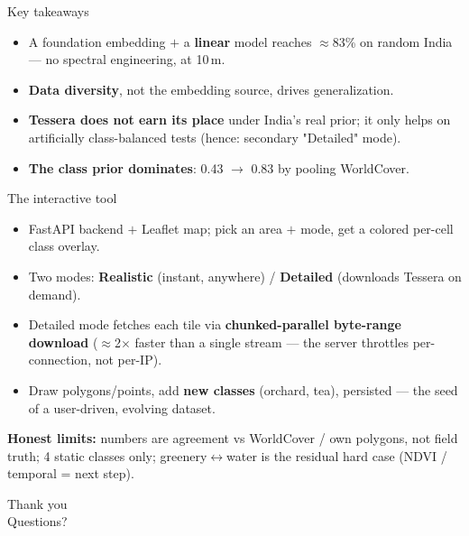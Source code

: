 \documentclass[aspectratio=169]{beamer}
\begin{document}
\begin{frame}{Key takeaways}
\begin{itemize}
  \item A foundation embedding $+$ a \textbf{linear} model reaches $\approx$83\% on
  random India --- no spectral engineering, at 10\,m.
  \item \textbf{Data diversity}, not the embedding source, drives generalization.
  \item \textbf{Tessera does not earn its place} under India's real prior; it only
  helps on artificially class-balanced tests (hence: secondary "Detailed" mode).
  \item \textbf{The class prior dominates}: 0.43 $\rightarrow$ 0.83 by pooling
  WorldCover.
\end{itemize}
\end{frame}

\begin{frame}{The interactive tool}
\begin{itemize}
  \item FastAPI backend $+$ Leaflet map; pick an area $+$ mode, get a colored
  per-cell class overlay.
  \item Two modes: \textbf{Realistic} (instant, anywhere) / \textbf{Detailed}
  (downloads Tessera on demand).
  \item Detailed mode fetches each tile via \textbf{chunked-parallel byte-range
  download} ($\approx$2$\times$ faster than a single stream --- the server throttles
  per-connection, not per-IP).
  \item Draw polygons/points, add \textbf{new classes} (orchard, tea), persisted ---
  the seed of a user-driven, evolving dataset.
\end{itemize}
\vspace{0.6em}
\textbf{Honest limits:} numbers are agreement vs WorldCover / own polygons, not
field truth; 4 static classes only; greenery$\leftrightarrow$water is the residual
hard case (NDVI / temporal = next step).
\end{frame}

\begin{frame}
\centering
\Large Thank you \\
\normalsize \vspace{0.5em} Questions?
\end{frame}
\end{document}
